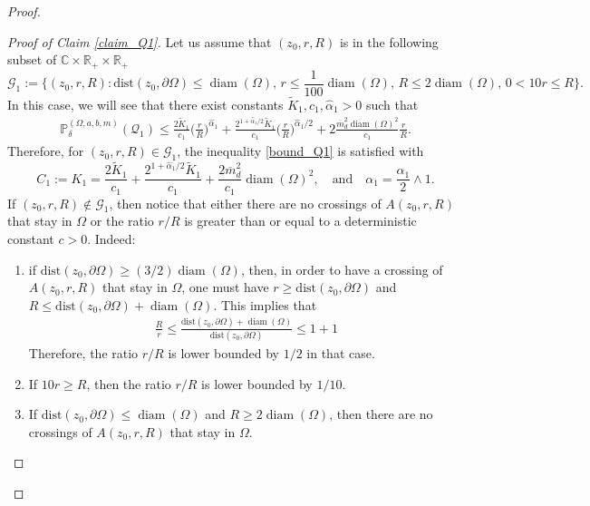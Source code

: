 \documentclass{article}
\newcommand{\PP}{{\mathbb{P}}}
\theoremstyle{definition}
\theoremstyle{remark}
\theoremstyle{remark}
\begin{document}
\begin{proof}
\begin{proof}[Proof of Claim \ref{claim_Q1}]
Let us assume that $(z_0, r, R)$ is in the following subset of $\mathbb{C} \times \mathbb{R}_{+} \times \mathbb{R}_{+}$
\begin{equation*}
    \mathcal{G}_1:= \{ (z_0, r, R): \text{dist}(z_0,\partial \Omega) \leq \operatorname{diam}(\Omega), \, r \leq \frac{1}{100}\operatorname{diam}(\Omega), \, R \leq 2\operatorname{diam}(\Omega), \, 0< 10r \leq R \}.
\end{equation*}
In this case, we will see that there exist constants $\tilde K_1, c_1, \hat \alpha_1 >0$ such that
\begin{align} \label{crossing_good}
    \PP_{\delta}^{(\Omega,a,b,m)}(\mathcal{Q}_1) \leq \frac{2\tilde K_1}{c_1}\bigg(\frac{r}{R}\bigg)^{\hat \alpha_1}
    + \frac{2^{1+\hat \alpha_1 /2}\tilde K_1}{c_1}\bigg(\frac{r}{R} \bigg)^{\hat \alpha_1 /2}
    + 2\frac{\overline{m}_d^{2}\operatorname{diam}(\Omega)^2}{c_1}\frac{r}{R}.
\end{align}
Therefore, for $(z_0,r,R) \in \mathcal{G}_1$, the inequality \eqref{bound_Q1} is satisfied with
\begin{equation} \label{Kalpha_1}
    C_1:= K_1 = \frac{2\tilde K_1}{c_1} + \frac{2^{1+\hat \alpha_1 /2}\tilde K_1}{c_1} + \frac{2\overline{m}_d^2}{c_1}\operatorname{diam}(\Omega)^2, \quad \text{and} \quad  \alpha_1 = \frac{\hat \alpha_1}{2} \wedge 1.
\end{equation}
If $(z_0,r,R) \notin \mathcal{G}_1$, then notice that either there are no crossings of $A(z_0,r,R)$ that stay in $\Omega$ or the ratio $r/R$ is greater than or equal to a deterministic constant $c>0$. Indeed:
\begin{enumerate}
    \item if $\text{dist}(z_0,\partial \Omega) \geq (3/2)\operatorname{diam}(\Omega)$, then, in order to have a crossing of $A(z_0,r,R)$ that stay in $\Omega$, one must have $r\geq \text{dist}(z_0,\partial \Omega)$ and $R\leq \text{dist}(z_0,\partial \Omega) + \operatorname{diam}(\Omega)$. This implies that
    \begin{align*}
        \frac{R}{r} \leq \frac{\text{dist}(z_0,\partial \Omega)+\operatorname{diam}(\Omega)}{\text{dist}(z_0,\partial \Omega)} \leq 1+1
    \end{align*}
    Therefore, the ratio $r/R$ is lower bounded by $1/2$ in that case.
    \item If $10r \geq R$, then the ratio $r/R$ is lower bounded by $1/10$.
    \item If $\text{dist}(z_0, \partial \Omega) \leq \operatorname{diam}(\Omega)$ and $R \geq 2 \operatorname{diam}(\Omega)$, then there are no crossings of $A(z_0,r,R)$ that stay in $\Omega$.

\end{enumerate}
\end{proof}
\end{proof}
\end{document}
